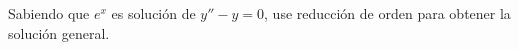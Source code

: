 Sabiendo que $e^x$ es solución de $y''-y=0$, use reducción de orden para obtener la solución general.
